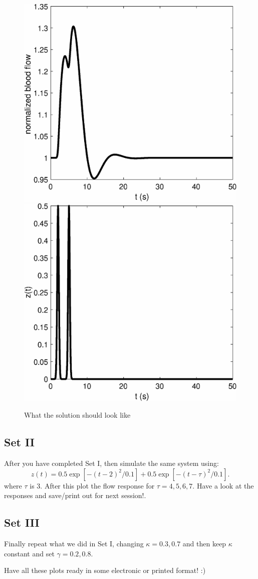 \documentclass[12pt]{article}
\begin{document}
\begin{figure}[h!]
\centering
\includegraphics[width=0.5\linewidth]{flow.eps}\includegraphics[width=0.5\linewidth]{input.eps}
\caption{What the solution should look like}
\end{figure}

\subsection{Set II}
After you have completed Set I, then simulate the same system using:
\begin{equation}
z(t) = 0.5\exp\left[-(t-2)^2/0.1\right] + 0.5\exp\left[-(t-\tau)^2/0.1\right]  .
\end{equation}
where $\tau$ is $3$. After this plot the flow response for $\tau=4,5,6,7$. Have a look at the responses and save/print out for next session!.
\subsection{Set III}
Finally repeat what we did in Set I, changing $\kappa=0.3,0.7$ and then keep $\kappa$ constant and set $\gamma = 0.2,0.8$. 

Have all these plots ready in some electronic or printed format! :) 
\end{document}
